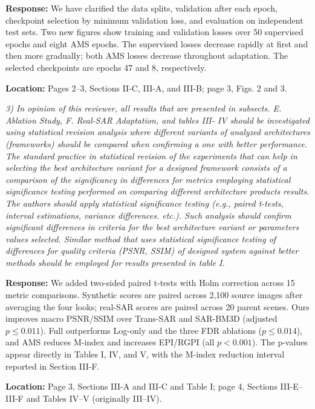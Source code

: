\documentclass[11pt,letterpaper]{article}
\begin{document}
\textbf{Response:} We have clarified the data splits, validation after each epoch, checkpoint selection by minimum validation loss, and evaluation on independent test sets. Two new figures show training and validation losses over 50 supervised epochs and eight AMS epochs. The supervised losses decrease rapidly at first and then more gradually; both AMS losses decrease throughout adaptation. The selected checkpoints are epochs 47 and 8, respectively.

\textbf{Location:} Pages 2--3, Sections II-C, III-A, and III-B; page 3, Figs. 2 and 3.

\clearpage
\textit{3) In opinion of this reviewer, all results that are presented in subsects. E. Ablation Study, F. Real-SAR Adaptation, and tables III- IV should be investigated using statistical revision analysis where different variants of analyzed architectures (frameworks) should be compared when confirming a one with better performance. The standard practice in statistical revision of the experiments that can help in selecting the best architecture variant for a designed framework consists of a comparison of the significancy in differences for metrics employing statistical significance testing performed on comparing different architecture products\textasciiacute{} results. The authors should apply statistical significance testing (e.g., paired t-tests, interval estimations, variance differences. etc.). Such analysis should confirm significant differences in criteria for the best architecture variant or parameters\textasciiacute{} values selected. Similar method that uses statistical significance testing of differences for quality criteria (PSNR, SSIM) of designed system against better methods should be employed for results presented in table I.}

\medskip
\textbf{Response:} We added two-sided paired t-tests with Holm correction across 15 metric comparisons. Synthetic scores are paired across 2,100 source images after averaging the four looks; real-SAR scores are paired across 20 parent scenes. Ours improves macro PSNR/SSIM over Trans-SAR and SAR-BM3D (adjusted $p\leq0.011$). Full outperforms Log-only and the three FDR ablations ($p\leq0.014$), and AMS reduces M-index and increases EPI/RGPI (all $p<0.001$). The p-values appear directly in Tables I, IV, and V, with the M-index reduction interval reported in Section III-F.

\textbf{Location:} Page 3, Sections III-A and III-C and Table I; page 4, Sections III-E--III-F and Tables IV--V (originally III--IV).
\end{document}

